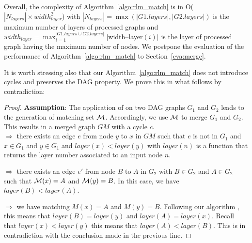     
   Overall, the complexity of Algorithm~\ref{algo:rlm_match} is in O($|N_{layers}| \times width_{layer}^{2}$)  with $|N_{layers}| =\max( |G1.layers| ,|G2.layers|)$ is the maximum number of layers of processed graphs and $width_{layer}=\max_{i=1}^{|G1.layers \cup G2.layers|} |$width--layer$(i)|$ is the layer of processed graph having the maximum number of nodes.
We postpone the evaluation of the performance of Algorithm~\ref{algo:rlm_match} to Section~\ref{eva:merge}.

It is worth stressing also that our Algorithm~\ref{algo:rlm_match} does not introduce cycles and preserves the DAG property. 
We prove this in what follows by contradiction:
\begin{proof}
\label{pr:DAG}
\textbf{Assumption}: 
The application of \rlm{} on two DAG graphs $G_1$ and $G_2$ leads to the generation of matching set ${\mathcal M}$.
Accordingly, we use ${\mathcal M}$ to merge $G_1$ and $G_2$. This results in a merged graph $GM$ with a cycle $c$.\\
$\Longrightarrow $ there exists an edge $e$ from node $y$ to $x$ in $GM$ such that $e$ is not in $G_1$ and $x \in G_1$ and $y \in G_1$ and $layer(x)<layer(y)$ with $layer(n)$ is a function that returns the layer number associated to an input node $n$.

$\Longrightarrow $ there exists an edge $e'$ from node $B$ to $A$ in $G_2$ with $B \in G_2$ and $A \in G_2$ such that ${\mathcal M}(x)=A$ and ${\mathcal M}(y)=B$. %
In this case,  we have  $layer(B)<layer(A)$.

$\Longrightarrow $ we have matching $M(x)=A$ and $M(y)=B$. Following our algorithm \rlm{}, this means that $layer(B)=layer(y)$ and $layer(A)=layer(x)$.
Recall that $layer(x)<layer(y)$ this means that $layer(A)<layer(B)$. This is in contradiction with the conclusion made in the previous line.
\end{proof}

